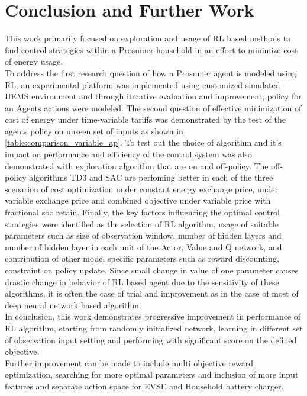 \chapter*{Conclusion and Further Work} \label{ch-5}  %
\begin{large}

\vspace*{3\baselineskip}

This work primarily focused on exploration and usage of RL based methods to find control strategies within a Prosumer household in an effort to minimize cost of energy usage. \\

To address the first research question of how a Prosumer agent is modeled using RL, an experimental platform was implemented using customized simulated HEMS environment and through iterative evaluation and improvement, policy for an Agents actions were modeled. The second question of effective minimization of cost of energy under time-variable tariffs was demonstrated by the test of the agents policy on unseen set of inputs as shown in \ref{table:comparison_variable_ap}. To test out the choice of algorithm and it's impact on performance and efficiency of the control system was also demonstrated with exploration algorithm that are on and off-policy. The off-policy algorithms TD3 and SAC are perfoming better in each of the three scenarion of cost optimization under constant energy exchange price, under variable exchange price  and combined objective under variable price with fractional soc retain. Finally, the key factors influencing the optimal control strategies were identified as the selection of RL algorithm, usage of suitable parameters such as size of observation window, number of hidden layers and number of hidden layer in each unit of the Actor, Value and Q network, and contribution of other model specific parameters such as reward discounting, constraint on policy update. Since small change in value of one parameter causes drastic change in behavior of RL based agent due to the sensitivity  of these algorithms, it is often the case of trial and improvement as in the case of most of deep neural network based algorithm. \\

In conclusion, this work demonstrates progressive improvement in performance of RL algorithm, starting from randomly initialized network, learning in different set of observation input setting and performing with significant score on the defined objective. \\

Further improvement can be made to include multi objective reward optimization, searching for more optimal parameters and inclusion of more input features and separate action space for EVSE and Household battery charger.

\end{large}
